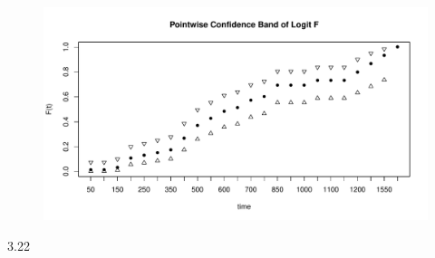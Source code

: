 \documentclass[paper=a4, fontsize=11pt]{scrartcl} %
\numberwithin{equation}{section} %
\numberwithin{figure}{section} %
\numberwithin{table}{section} %
\begin{document}
		\begin{figure}[h]
			\includegraphics[width = 6 in]{3_21.pdf}
		\end{figure}		
\newpage
3.22
\end{document}
